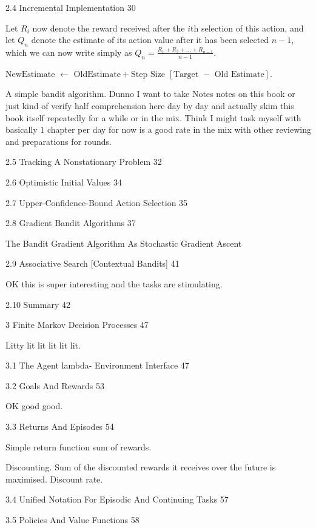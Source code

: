 2.4 Incremental Implementation 30

Let $R_i$ now denote the reward received after the $i$th selection of this action, and let $Q_n$ denote the estimate of its action value after it has been selected $n-1$, which we can now write simply as $Q_n = \frac{R_1 + R_2 + \dots + R_{n-1}}{n-1}$.

$\text{NewEstimate } \leftarrow \text{ OldEstimate} + \text{Step Size }[\text{Target }-\text{ Old Estimate}]$.

A simple bandit algorithm. Dunno I want to take Notes notes on this book or just kind of verify half comprehension here day by day and actually skim this book itself repeatedly for a while or in the mix. Think I might task myself with basically $1$ chapter per day for now is a good rate in the mix with other reviewing and preparations for rounds.

2.5 Tracking A Nonstationary Problem 32



2.6 Optimistic Initial Values 34



2.7 Upper-Confidence-Bound Action Selection 35



2.8 Gradient Bandit Algorithms 37

The Bandit Gradient Algorithm As Stochastic Gradient Ascent

2.9 Associative Search [Contextual Bandits] 41

OK this is super interesting and the tasks are stimulating.

2.10 Summary 42



3 Finite Markov Decision Processes 47

Litty lit lit lit lit lit.

3.1 The Agent lambda- Environment Interface 47



3.2 Goals And Rewards 53

OK good good.

3.3 Returns And Episodes 54

Simple return function sum of rewards.

Discounting. Sum of the discounted rewards it receives over the future is maximised. Discount rate.

3.4 Unified Notation For Episodic And Continuing Tasks 57



3.5 Policies And Value Functions 58

